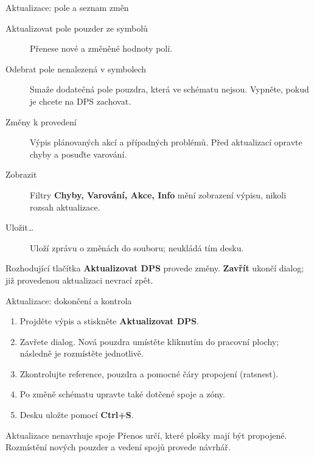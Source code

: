 \documentclass{beamer}
\begin{document}
\begin{frame}{Aktualizace: pole a seznam změn}
	\small
	\begin{description}
		\item[Aktualizovat pole pouzder ze symbolů] Přenese nové a změněné hodnoty polí.
		\item[Odebrat pole nenalezená v symbolech] Smaže dodatečná pole pouzdra, která ve schématu nejsou. Vypněte, pokud je chcete na DPS zachovat.
		\item[Změny k provedení] Výpis plánovaných akcí a případných problémů. Před aktualizací opravte chyby a posuďte varování.
		\item[Zobrazit] Filtry \textbf{Chyby, Varování, Akce, Info} mění zobrazení výpisu, nikoli rozsah aktualizace.
		\item[Uložit\ldots] Uloží zprávu o změnách do souboru; neukládá tím desku.
	\end{description}
	\begin{block}{Rozhodující tlačítka}
	\textbf{Aktualizovat DPS} provede změny. \textbf{Zavřít} ukončí dialog; již provedenou aktualizaci nevrací zpět.
	\end{block}
\end{frame}

\begin{frame}{Aktualizace: dokončení a kontrola}
	\begin{enumerate}
		\item Projděte výpis a stiskněte \textbf{Aktualizovat DPS}.
		\item Zavřete dialog. Nová pouzdra umístěte kliknutím do pracovní plochy; následně je rozmístěte jednotlivě.
		\item Zkontrolujte reference, pouzdra a pomocné čáry propojení (ratsnest).
		\item Po změně schématu upravte také dotčené spoje a zóny.
		\item Desku uložte pomocí \textbf{Ctrl+S}.
	\end{enumerate}
	\begin{block}{Aktualizace nenavrhuje spoje}
	Přenos určí, které plošky mají být propojené. Rozmístění nových pouzder a vedení spojů provede návrhář.
	\end{block}
\end{frame}
\end{document}
